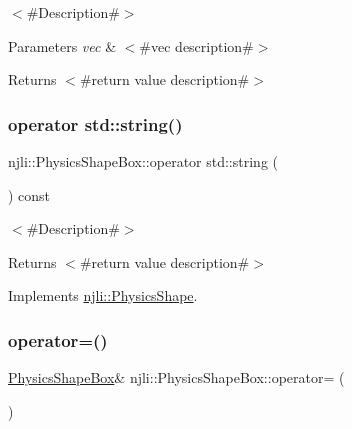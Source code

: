 $<$\#\+Description\#$>$


\begin{DoxyParams}{Parameters}
{\em vec} & $<$\#vec description\#$>$\\
\hline
\end{DoxyParams}
\begin{DoxyReturn}{Returns}
$<$\#return value description\#$>$ 
\end{DoxyReturn}
\mbox{\label{classnjli_1_1_physics_shape_box_aeeaae082ee5e0fcc1fe07cff9af3d940}} 
\subsubsection{\texorpdfstring{operator std\+::string()}{operator std::string()}}
{\footnotesize\ttfamily njli\+::\+Physics\+Shape\+Box\+::operator std\+::string (\begin{DoxyParamCaption}{ }\end{DoxyParamCaption}) const\hspace{0.3cm}{\ttfamily [virtual]}}

$<$\#\+Description\#$>$

\begin{DoxyReturn}{Returns}
$<$\#return value description\#$>$ 
\end{DoxyReturn}


Implements \mbox{\hyperlink{classnjli_1_1_physics_shape_a890d915f88af06dcf1ac1fa4f5943dc2}{njli\+::\+Physics\+Shape}}.

\mbox{\label{classnjli_1_1_physics_shape_box_a3096f9c7ee5fe5a0b15672d16bd330e7}} 
\subsubsection{\texorpdfstring{operator=()}{operator=()}}
{\footnotesize\ttfamily \mbox{\hyperlink{classnjli_1_1_physics_shape_box}{Physics\+Shape\+Box}}\& njli\+::\+Physics\+Shape\+Box\+::operator= (\begin{DoxyParamCaption}\item[{const \mbox{\hyperlink{classnjli_1_1_physics_shape_box}{Physics\+Shape\+Box}} \&}]{ }\end{DoxyParamCaption})\hspace{0.3cm}{\ttfamily [protected]}}

